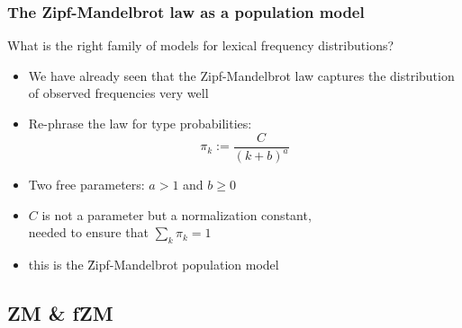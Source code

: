 \documentclass[handout,notes=show,t]{beamer} %
\begin{document}
\begin{frame}
  \frametitle{The Zipf-Mandelbrot law as a population model}

  What is the right family of models for lexical frequency distributions?
  \begin{itemize}
  \item We have already seen that the Zipf-Mandelbrot law captures the
    distribution of observed frequencies very well%
    \pause
  \item Re-phrase the law for type probabilities:
    \[ \pi_k := \frac{C}{(k + b) ^ a} \]
  \item Two free parameters: $a > 1$ and $b \geq 0$
  \item $C$ is not a parameter but a normalization constant,\\
    needed to ensure that $\sum_k \pi_k = 1$
  \item this is the \h{Zipf-Mandelbrot} population model
  \end{itemize}
\end{frame}

\subsection{ZM \& fZM}
\end{document}
